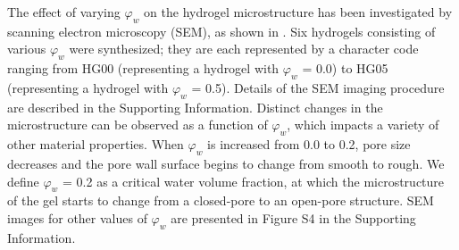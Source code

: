 The effect of varying \(\varphi_{w}\) on the hydrogel microstructure has been investigated by scanning electron microscopy (SEM), as shown in . Six hydrogels consisting of various \(\varphi_{w}\) were synthesized; they are each represented by a character code ranging from HG00 (representing a hydrogel with \(\varphi_{w}\) = 0.0) to HG05 (representing a hydrogel with \(\varphi_{w}\) = 0.5). Details of the SEM imaging procedure are described in the Supporting Information. Distinct changes in the microstructure can be observed as a function of \(\varphi_{w}\), which impacts a variety of other material properties. When \(\varphi_{w}\) is increased from 0.0 to 0.2, pore size decreases and the pore wall surface begins to change from smooth to rough. We define \(\varphi_{w}\) = 0.2 as a critical water volume fraction, at which the microstructure of the gel starts to change from a closed-pore to an open-pore structure. SEM images for other values of \(\varphi_{w}\) are presented in Figure S4 in the Supporting Information.
